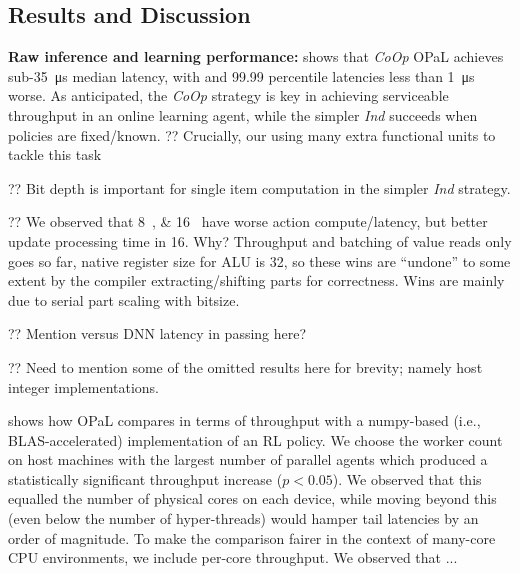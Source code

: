 \documentclass[sigconf,natbib=false]{acmart}
\newcommand{\fakepara}[1]{\noindent\textbf{#1:}}
\newcommand{\approachshort}{OPaL}
\newcommand{\Coopfw}{\emph{CoOp}}
\newcommand{\Indfw}{\emph{Ind}}
\begin{document}
\subsection{Results and Discussion}\label{sec:results}
\fakepara{Raw inference and learning performance}
 shows that \Coopfw{} \approachshort{} achieves sub-\SI{35}{\micro\second} median latency, with  and \num{99.99} percentile latencies less than \SI{1}{\micro\second} worse.
As anticipated, the \Coopfw{} strategy is key in achieving serviceable throughput in an online learning agent, while the simpler \Indfw{} succeeds when policies are fixed/known.
?? Crucially, our using many extra functional units to tackle this task

?? Bit depth is important for single item computation in the simpler \Indfw{} strategy.

?? We observed that \SIlist{8;16}{\bit} have worse action compute/latency, but better update processing time in \SI{16}{\bit}. Why? Throughput and batching of value reads only goes so far, native register size for ALU is \SI{32}{\bit}, so these wins are ``undone'' to some extent by the compiler extracting/shifting parts  for correctness. Wins are mainly due to serial part scaling with bitsize.

?? Mention versus DNN latency in passing here?

?? Need to mention some of the omitted results here for brevity; namely host integer implementations.

\begin{table}
	\caption{Latencies and computation times for \approachshort{} versus commodity hardware hosts. On-device execution is crucial in not only lowering latencies, but in reducing tail latencies. Lower is better, with the best marked \emph{in bold}.\label{tab:lats}}
\end{table}

\begin{table}
	\caption{Action and update throughputs for \approachshort{} versus commodity hardware hosts. Most designs cannot scale online performance with additional cores. Higher is better, with the best marked \emph{in bold}.\label{tab:tputs}}
\end{table}

 shows how \approachshort{} compares in terms of throughput with a numpy-based (i.e., BLAS-accelerated) implementation of an RL policy.
We choose the worker count on host machines with the largest number of parallel agents which produced a statistically significant throughput increase ($p < 0.05$).
We observed that this equalled the number of physical cores on each device, while moving beyond this (even below the number of hyper-threads) would hamper tail latencies by an order of magnitude.
To make the comparison fairer in the context of many-core CPU environments, we include per-core throughput.
We observed that ...
\end{document}
